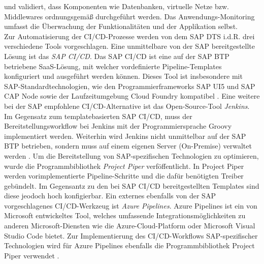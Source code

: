 und validiert, dass Komponenten wie Datenbanken, virtuelle Netze bzw. Middlewares ordnungsgemäß durchgeführt werden. Das Anwendungs-Monitoring umfasst die Überwachung der Funktionalitäten und der Applikation selbst.\\ 
Zur Automatisierung der CI/CD-Prozesse werden von dem SAP DTS i.d.R. drei verschiedene Tools vorgeschlagen. Eine unmittelbare von der SAP bereitgestellte Lösung ist das \textit{\ac{SAP CI/CD}}. Das SAP CI/CD ist eine auf der SAP BTP betriebene SaaS-Lösung, mit welcher vordefinierte Pipeline-Templates konfiguriert und ausgeführt werden können. Dieses Tool ist insbesondere mit SAP-Standardtechnologien, wie den Programmierframeworks SAP UI5 und SAP CAP Node sowie der Laufzeitumgebung Cloud Foundry kompatibel \cite{.20230405}. Eine weitere bei der SAP empfohlene CI/CD-Alternative ist das Open-Source-Tool \textit{Jenkins}. Im Gegensatz zum templatebasierten SAP CI/CD, muss der Bereitstellungsworkflow bei Jenkins mit der Programmiersprache Groovy implementiert werden. Weiterhin wird Jenkins nicht unmittelbar auf der SAP BTP betrieben, sondern muss auf einem eigenen Server (On-Premise) verwaltet werden \cite[266]{Belmont.2018}. Um die Bereitstellung von SAP-spezifischen Technologien zu optimieren, wurde die Programmbibliothek \textit{Project Piper} verföffentlicht. In Project Piper werden vorimplementierte Pipeline-Schritte und die dafür benötigten Treiber gebündelt. Im Gegensantz zu den bei SAP CI/CD bereitgestellten Templates sind diese jeodoch hoch konfigierbar.
Ein externes ebenfalls von der SAP vorgeschlagenes CI/CD-Werkzeug ist \textit{Azure Pipelines}. Azure Pipelines ist ein von Microsoft entwickeltes Tool, welches umfassende Integrationsmöglichkeiten zu anderen Microsoft-Diensten wie die Azure-Cloud-Platform oder Microsoft Visual Studio Code bietet. Zur Implementierung des CI/CD-Workflows SAP-spezifischer Technologien wird für Azure Pipelines ebenfalls die Programmbibliothek Project Piper verwendet \cite{Naveen.20230224}.
